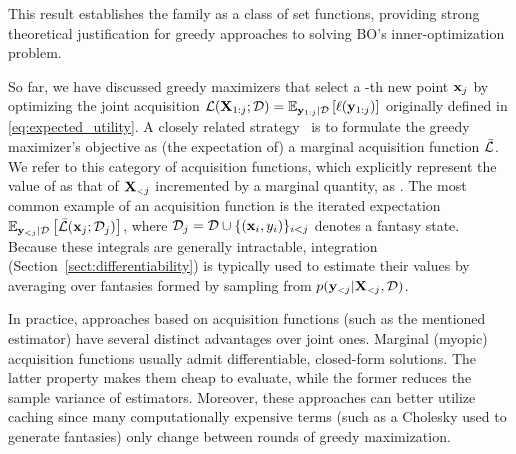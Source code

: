 This result establishes the \MM{} family as a class of \SM{} set functions, providing strong theoretical justification for greedy approaches to solving BO's inner-optimization problem.

So far, we have discussed greedy maximizers that select a \roundIdx-th new point \(\NEW{0}{\x}\) by optimizing the joint acquisition
\(
    \Acq(\BOTH{0}{\X}; \data) = \E_{\BOTH{0}{\Y}|\data}\left[\acq(\BOTH{0}{\Y})\right]
\) originally defined in \eqref{eq:expected_utility}. 
% 
A closely related strategy~\cite{ginsbourger2011dealing,snoek-nips12a,contal2013parallel,desautels2014parallelizing} is to formulate the greedy maximizer's objective as (the expectation of) a marginal acquisition function \(\bar{\mathcal{L}}\). We refer to this category of acquisition functions, which explicitly represent the value of 
as that of \(\OLD{0}{\X}\) incremented by a marginal quantity, as \emph{\mmform{}}. The most common example of an \mmform{} acquisition function is the iterated expectation
\(
    \E_{\OLD{1}{\Y}|\data}
    \left[
    \iAcq(\NEW{1}{\x}; \data_{\roundIdx})
    \right]
\), where \(\mathcal{D}_{j} = \mathcal{D} \cup \{(\mathbf{x}_{i},y_{i})\}_{i<j}\) denotes a fantasy state. Because these integrals are generally intractable, \MC{} integration (Section~\ref{sect:differentiability}) is typically used to estimate their values by averaging over fantasies formed by sampling from \(p(\OLD{1}{\Y}| \OLD{1}{\X}, \data)\).


In practice, approaches based on \mmform{} acquisition functions (such as the mentioned \MC estimator) have several distinct advantages over joint ones. Marginal (myopic) acquisition functions usually admit differentiable, closed-form solutions. The latter property makes them cheap to evaluate, while the former reduces the sample variance of \MC estimators. Moreover, these approaches can better utilize caching since many computationally expensive terms (such as a Cholesky used to generate fantasies) only change between rounds of greedy maximization.

